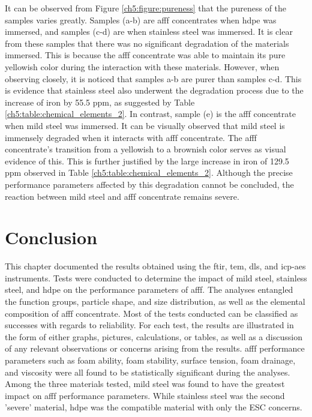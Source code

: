 It can be observed from Figure \ref{ch5:figure:pureness} that the pureness of the samples varies greatly. Samples (a-b) are \acrshort{afff} concentrates when \acrshort{hdpe} was immersed, and samples (c-d) are when stainless steel was immersed. It is clear from these samples that there was no significant degradation of the materials immersed. This is because the \acrshort{afff} concentrate was able to maintain its pure yellowish color during the interaction with these materials. However, when observing closely, it is noticed that samples a-b are purer than samples c-d. This is evidence that stainless steel also underwent the degradation process due to the increase of iron by 55.5 ppm, as suggested by Table \ref{ch5:table:chemical_elements_2}. In contrast, sample (e) is the \acrshort{afff} concentrate when mild steel was immersed. It can be visually observed that mild steel is immensely degraded when it interacts with \acrshort{afff} concentrate. The \acrshort{afff} concentrate's transition from a yellowish to a brownish color serves as visual evidence of this. This is further justified by the large increase in iron of 129.5 ppm observed in Table \ref{ch5:table:chemical_elements_2}. Although the precise performance parameters affected by this degradation cannot be concluded, the reaction between mild steel and \acrshort{afff} concentrate remains severe.

\section{Conclusion}
This chapter documented the results obtained using the \acrshort{ftir}, \acrshort{tem}, \acrshort{dls}, and \acrshort{icp-aes} instruments. Tests were conducted to determine the impact of mild steel, stainless steel, and \acrshort{hdpe} on the performance parameters of \acrshort{afff}. The analyses entangled the function groups, particle shape, and size distribution, as well as the elemental composition of \acrshort{afff} concentrate. Most of the tests conducted can be classified as successes with regards to reliability. For each test, the results are illustrated in the form of either graphs, pictures, calculations, or tables, as well as a discussion of any relevant observations or concerns arising from the results. \acrshort{afff} performance parameters such as foam ability, foam stability, surface tension, foam drainage, and viscosity were all found to be statistically significant during the analyses. Among the three materials tested, mild steel was found to have the greatest impact on \acrshort{afff} performance parameters. While stainless steel was the second 'severe' material, \acrshort{hdpe} was the compatible material with only the ESC concerns.
